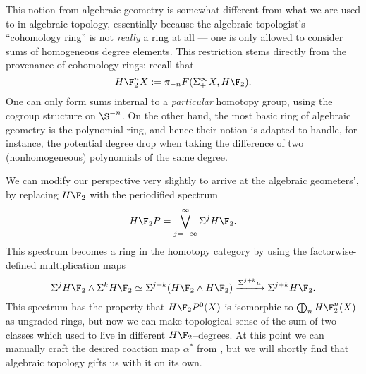This notion from algebraic geometry is somewhat different from what we are used to in algebraic topology, essentially because the algebraic topologist's ``cohomology ring'' is not \emph{really} a ring at all --- one is only allowed to consider sums of homogeneous degree elements.  This restriction stems directly from the provenance of cohomology rings: recall that \[H\F_2^n X := \pi_{-n} F(\Susp^\infty_+ X, H\F_2).\]  One can only form sums internal to a \emph{particular} homotopy group, using the cogroup structure on $\S^{-n}$.  On the other hand, the most basic ring of algebraic geometry is the polynomial ring, and hence their notion is adapted to handle, for instance, the potential degree drop when taking the difference of two (nonhomogeneous) polynomials of the same degree.

We can modify our perspective very slightly to arrive at the algebraic geometers', by replacing $H\F_2$ with the periodified spectrum \[H\F_2P = \bigvee_{j=-\infty}^\infty \Susp^j H\F_2.\]  This spectrum becomes a ring in the homotopy category by using the factorwise-defined multiplication maps \[\Susp^j H\F_2 \sm \Susp^k H\F_2 \simeq \Susp^{j+k} (H\F_2 \sm H\F_2) \xrightarrow{\Susp^{j+k} \mu} \Susp^{j+k} H\F_2.\]  This spectrum has the property that $H\F_2P^0(X)$ is isomorphic to $\bigoplus_n H\F_2^n(X)$ as ungraded rings, but now we can make topological sense of the sum of two classes which used to live in different $H\F_2$--degrees.  At this point we can manually craft the desired coaction map $\alpha^*$ from , but we will shortly find that algebraic topology gifts us with it on its own.

